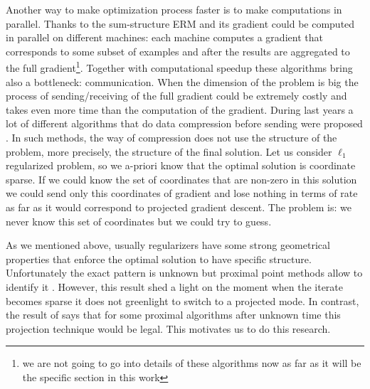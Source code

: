 Another way to make optimization process faster is to make computations in parallel. Thanks to the sum-structure ERM and its gradient could be computed in parallel on different machines: each machine computes a gradient that corresponds to some subset of examples and after the results are aggregated to the full gradient\footnote{we are not going to go into details of these algorithms now as far as it will be the specific section in this work}. Together with computational speedup these algorithms bring also a bottleneck: communication. When the dimension of the problem is big the process of sending/receiving of the full gradient could be extremely costly and takes even more time than the computation of the gradient. During last years a lot of different algorithms that do data compression before sending were proposed \cite{alistarh2017qsgd, wangni2018gradient, hubara2017quantized, wang2017efficient}. In such methods, the way of compression does not use the structure of the problem, more precisely, the structure of the final solution. Let us consider $\ell_1$ regularized problem, so we a-priori know that the optimal solution is coordinate sparse. If we could know the set of coordinates that are non-zero in this solution we could send only this coordinates of gradient and lose nothing in terms of rate as far as it would correspond to projected gradient descent. The problem is: we never know this set of coordinates but we could try to guess. 

As we mentioned above, usually regularizers have some strong geometrical properties that enforce the optimal solution to have specific structure. Unfortunately the exact pattern is unknown but proximal point methods allow to identify it \cite{nutini2019active}. However, this result shed a light on the moment when the iterate becomes sparse it does not greenlight to switch to a projected mode. In contrast, the result of \cite{fadili2018sensitivity} says that for some proximal algorithms after unknown time this projection technique would be legal. {\color{blue} This motivates us to do this research.}